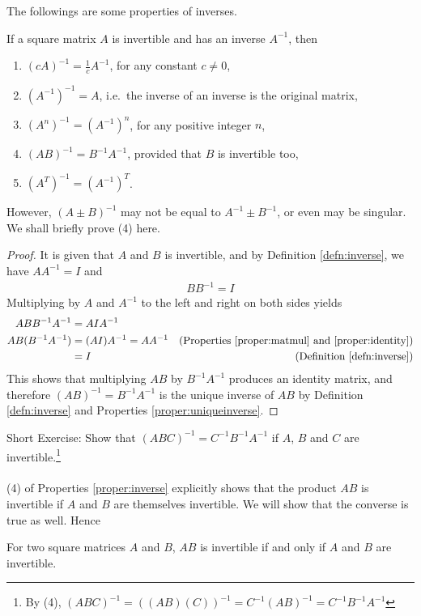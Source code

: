 The followings are some properties of inverses.
\begin{proper}
\label{proper:inverse}
If a square matrix $A$ is invertible and has an inverse $A^{-1}$, then
\begin{enumerate}
\item $(cA)^{-1} = \frac{1}{c}A^{-1}$, for any constant $c \neq 0$,
\item $(A^{-1})^{-1} = A$, i.e.\ the inverse of an inverse is the original matrix,
\item $(A^n)^{-1} = (A^{-1})^n$, for any positive integer $n$,
\item $(AB)^{-1} = B^{-1}A^{-1}$, provided that $B$ is invertible too,
\item $(A^T)^{-1} = (A^{-1})^T$.
\end{enumerate}
\end{proper}
However, $(A\pm B)^{-1}$ may not be equal to $A^{-1} \pm B^{-1}$, or even may be singular. We shall briefly prove (4) here.
\begin{proof}
It is given that $A$ and $B$ is invertible, and by Definition \ref{defn:inverse}, we have $AA^{-1} = I$ and 
\begin{align*}
BB^{-1} = I    
\end{align*}
Multiplying by $A$ and $A^{-1}$ to the left and right on both sides yields
\begin{align*}
ABB^{-1}A^{-1} &= AIA^{-1} \\
AB(B^{-1}A^{-1}) &= (AI)A^{-1} = AA^{-1} & \text{(Properties \ref{proper:matmul} and \ref{proper:identity})} \\
&= I & \text{(Definition \ref{defn:inverse})}
\end{align*}
This shows that multiplying $AB$ by $B^{-1}A^{-1}$ produces an identity matrix, and therefore $(AB)^{-1} = B^{-1}A^{-1}$ is the unique inverse of $AB$ by Definition \ref{defn:inverse} and Properties \ref{proper:uniqueinverse}.
\end{proof}
Short Exercise: Show that $(ABC)^{-1} = C^{-1}B^{-1}A^{-1}$ if $A$, $B$ and $C$ are invertible.\footnote{By (4), $(ABC)^{-1} = ((AB)(C))^{-1} = C^{-1}(AB)^{-1} = C^{-1}B^{-1}A^{-1}$}\\
\\
(4) of Properties \ref{proper:inverse} explicitly shows that the product $AB$ is invertible if $A$ and $B$ are themselves invertible. We will show that the converse is true as well. Hence
\begin{proper}
\label{proper:ABinv}
For two square matrices $A$ and $B$, $AB$ is invertible if and only if $A$ and $B$ are invertible.
\end{proper}
